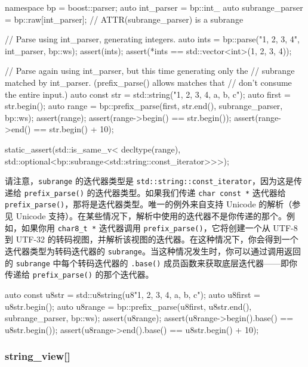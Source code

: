 \begin{code}
namespace bp = boost::parser;
auto int_parser = bp::int_ %
auto subrange_parser = bp::raw[int_parser];  // ATTR(subrange_parser) is a subrange

// Parse using int_parser, generating integers.
auto ints = bp::parse("1, 2, 3, 4", int_parser, bp::ws);
assert(ints);
assert(*ints == std::vector<int>({1, 2, 3, 4}));

// Parse again using int_parser, but this time generating only the
// subrange matched by int_parser.  (prefix_parse() allows matches that
// don't consume the entire input.)
auto const str = std::string("1, 2, 3, 4, a, b, c");
auto first = str.begin();
auto range = bp::prefix_parse(first, str.end(), subrange_parser, bp::ws);
assert(range);
assert(range->begin() == str.begin());
assert(range->end() == str.begin() + 10);

static_assert(std::is_same_v<
              decltype(range),
              std::optional<bp::subrange<std::string::const_iterator>>>);
\end{code}

请注意，\texttt{subrange} 的迭代器类型是 \texttt{std::string::const\_iterator}，因为这是传递给 \texttt{prefix\_parse()} 的迭代器类型。如果我们传递 \texttt{char const *} 迭代器给 \texttt{prefix\_parse()}，那将是迭代器类型。唯一的例外来自支持 Unicode 的解析（参见 Unicode 支持）。在某些情况下，解析中使用的迭代器不是你传递的那个。例如，如果你用 \texttt{char8\_t *} 迭代器调用 \texttt{prefix\_parse()}，它将创建一个从 UTF-8 到 UTF-32 的转码视图，并解析该视图的迭代器。在这种情况下，你会得到一个迭代器类型为转码迭代器的 \texttt{subrange}。当这种情况发生时，你可以通过调用返回的 \texttt{subrange} 中每个转码迭代器的 \texttt{.base()} 成员函数来获取底层迭代器——即你传递给 \texttt{prefix\_parse()} 的那个迭代器。

\begin{code}
auto const u8str = std::u8string(u8"1, 2, 3, 4, a, b, c");
auto u8first = u8str.begin();
auto u8range = bp::prefix_parse(u8first, u8str.end(), subrange_parser, bp::ws);
assert(u8range);
assert(u8range->begin().base() == u8str.begin());
assert(u8range->end().base() == u8str.begin() + 10);
\end{code}

\subsubsection{string\_view{[}{]}}

